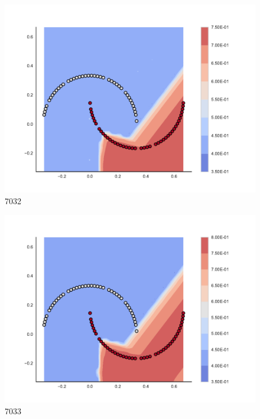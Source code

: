 \begin{subfigure}[b]{0.09\textwidth}
    \includegraphics[clip, trim=2.35cm 1.75cm 4.5cm 0cm,width=\textwidth]{img/convergence/7032.pdf}
    \caption{7032}
    \label{fig:convergence_7032}
\end{subfigure}
%
\begin{subfigure}[b]{0.09\textwidth}
    \includegraphics[clip, trim=2.35cm 1.75cm 4.5cm 0cm,width=\textwidth]{img/convergence/7033.pdf}
    \caption{7033}
    \label{fig:convergence_7033}
\end{subfigure}
%
